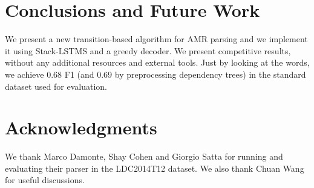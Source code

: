 \documentclass[11pt,a4paper]{article}
\begin{document}
\section{Conclusions and Future Work}

We present a new transition-based algorithm for AMR parsing and we implement
it using Stack-LSTMS and a greedy decoder. We present competitive results, without any additional 
resources and  external tools. Just by looking at the words, we achieve 0.68 F1 (and 0.69 by 
preprocessing dependency trees) in the standard dataset used for evaluation.



\section*{Acknowledgments}
 We thank Marco Damonte, Shay Cohen and Giorgio Satta for running and evaluating their parser 
 in the LDC2014T12 dataset. We also thank Chuan Wang for useful discussions.



\end{document}
